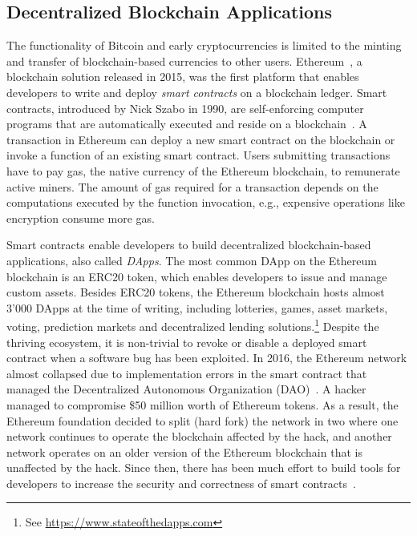 \subsection{Decentralized Blockchain Applications}
The functionality of Bitcoin and early cryptocurrencies is limited to the minting and transfer of blockchain-based currencies to other users.
Ethereum~\cite{wood2014ethereum}, a blockchain solution released in 2015, was the first platform that enables developers to write and deploy \emph{smart contracts} on a blockchain ledger.
Smart contracts, introduced by Nick Szabo in 1990, are self-enforcing computer programs that are automatically executed and reside on a blockchain~\cite{szabo1996smart}.
A transaction in Ethereum can deploy a new smart contract on the blockchain or invoke a function of an existing smart contract.
Users submitting transactions have to pay gas, the native currency of the Ethereum blockchain, to remunerate active miners.
The amount of gas required for a transaction depends on the computations executed by the function invocation, e.g., expensive operations like encryption consume more gas.


Smart contracts enable developers to build decentralized blockchain-based applications, also called \emph{DApps}.
The most common DApp on the Ethereum blockchain is an ERC20 token, which enables developers to issue and manage custom assets.
Besides ERC20 tokens, the Ethereum blockchain hosts almost 3'000 DApps at the time of writing, including lotteries, games, asset markets, voting, prediction markets and decentralized lending solutions.\footnote{See \url{https://www.stateofthedapps.com}}
Despite the thriving ecosystem, it is non-trivial to revoke or disable a deployed smart contract when a software bug has been exploited.
In 2016, the Ethereum network almost collapsed due to implementation errors in the smart contract that managed the Decentralized Autonomous Organization (DAO)~\cite{mehar2019understanding}.
A hacker managed to compromise \$50 million worth of Ethereum tokens.
As a result, the Ethereum foundation decided to split (hard fork) the network in two where one network continues to operate the blockchain affected by the hack, and another network operates on an older version of the Ethereum blockchain that is unaffected by the hack.
Since then, there has been much effort to build tools for developers to increase the security and correctness of smart contracts~\cite{breidenbach2018enter,brent2020ethainter}.


